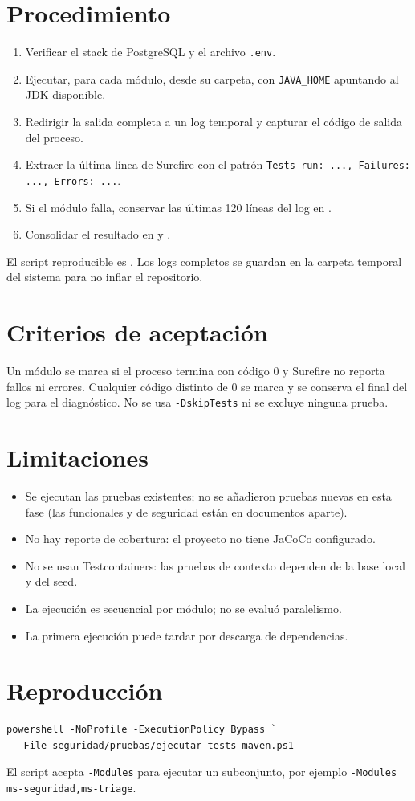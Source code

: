 \documentclass[11pt]{article}
\begin{document}
\section{Procedimiento}

\begin{enumerate}
  \item Verificar el stack de PostgreSQL y el archivo \texttt{.env}.
  \item Ejecutar, para cada módulo, 
  desde su carpeta, con \texttt{JAVA\_HOME} apuntando al JDK disponible.
  \item Redirigir la salida completa a un log temporal y capturar el código de
  salida del proceso.
  \item Extraer la última línea de Surefire con el patrón
  \texttt{Tests run: ..., Failures: ..., Errors: ...}.
  \item Si el módulo falla, conservar las últimas 120 líneas del log en
  .
  \item Consolidar el resultado en  y
  .
\end{enumerate}

El script reproducible es
. Los logs completos se
guardan en la carpeta temporal del sistema para no inflar el repositorio.

\section{Criterios de aceptación}

Un módulo se marca \ok{} si el proceso termina con código 0 y Surefire no
reporta fallos ni errores. Cualquier código distinto de 0 se marca \fallo{} y
se conserva el final del log para el diagnóstico. No se usa
\texttt{-DskipTests} ni se excluye ninguna prueba.

\section{Limitaciones}

\begin{itemize}
  \item Se ejecutan las pruebas existentes; no se añadieron pruebas nuevas en
  esta fase (las funcionales y de seguridad están en documentos aparte).
  \item No hay reporte de cobertura: el proyecto no tiene JaCoCo configurado.
  \item No se usan Testcontainers: las pruebas de contexto dependen de la base
  local y del seed.
  \item La ejecución es secuencial por módulo; no se evaluó paralelismo.
  \item La primera ejecución puede tardar por descarga de dependencias.
\end{itemize}

\section{Reproducción}

\begin{verbatim}
powershell -NoProfile -ExecutionPolicy Bypass `
  -File seguridad/pruebas/ejecutar-tests-maven.ps1
\end{verbatim}

El script acepta \texttt{-Modules} para ejecutar un subconjunto, por ejemplo
\texttt{-Modules ms-seguridad,ms-triage}.
\end{document}
